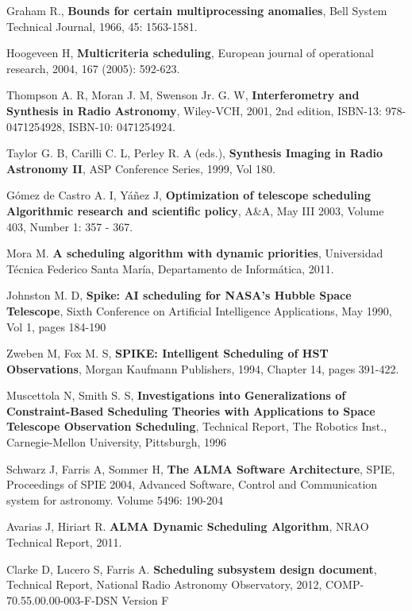 \documentclass[11pt]{article}
\begin{document}
\begin{thebibliography}{9}
	Graham R.,
	\textbf{Bounds for certain multiprocessing anomalies},
	Bell System Technical Journal,
	1966,
	45: 1563-1581.

	Hoogeveen H,
	\textbf{Multicriteria scheduling},
	European journal of operational research,
	2004,
	167 (2005): 592-623.
	
	Thompson A. R, Moran J. M, Swenson Jr. G. W, 
	\textbf{Interferometry and Synthesis in Radio Astronomy},
	Wiley-VCH,
	2001,
	2nd edition,
	ISBN-13: 978-0471254928, ISBN-10: 0471254924.
	
	Taylor G. B, Carilli C. L, Perley R. A (eds.),
	\textbf{Synthesis Imaging in Radio Astronomy II},
	ASP Conference Series,
	1999,
	Vol 180.
	
	G\'omez de Castro A. I, Y\'a\~nez J,
	\textbf{Optimization of telescope scheduling Algorithmic research and scientific policy},
	 A\&A,
	 May III 2003,
	 Volume 403, Number 1: 357 - 367.
	 
	Mora M.
	\textbf{A scheduling algorithm with dynamic priorities},
	Universidad T\'ecnica Federico Santa Mar\'ia, Departamento de Inform\'atica,
	2011.

	Johnston M. D,
	\textbf{Spike: AI scheduling for NASA's Hubble Space Telescope},
	Sixth Conference on Artificial Intelligence  Applications,
	May 1990,
	Vol 1, pages 184-190
	
	Zweben M, Fox M. S,
	\textbf{SPIKE: Intelligent Scheduling of HST Observations},
	Morgan Kaufmann Publishers,
	1994,
	Chapter 14, pages 391-422.

	Muscettola N, Smith S. S,
	\textbf{Investigations into Generalizations of Constraint-Based Scheduling Theories with Applications to Space Telescope Observation Scheduling},
	Technical Report,
	The Robotics Inst., Carnegie-Mellon University,
	Pittsburgh, 1996

	Schwarz J, Farris A, Sommer H,
	\textbf{The ALMA Software Architecture},
	SPIE,
	Proceedings of SPIE 2004, Advanced Software, Control and Communication system for astronomy.
	Volume 5496: 190-204

	Avarias J, Hiriart R.
	\textbf{ALMA Dynamic Scheduling Algorithm},
	NRAO Technical Report,
	2011.

	Clarke D, Lucero S, Farris A.
	\textbf{Scheduling subsystem design document},
	Technical Report,
	National Radio Astronomy Observatory,
	2012,
	COMP-70.55.00.00-003-F-DSN Version F


\end{thebibliography}
\end{document}

